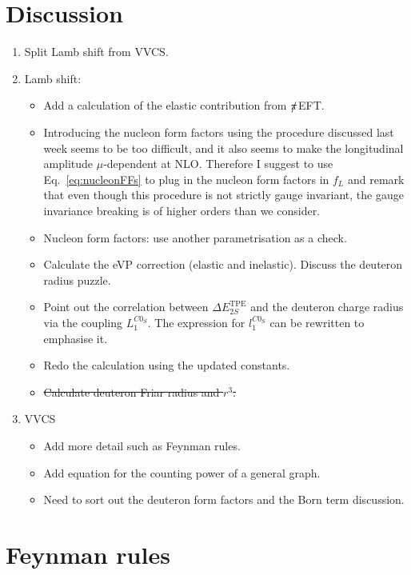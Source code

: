 \documentclass[prl,
twocolumn,
showpacs,preprintnumbers,amsmath,amssymb,
superscriptaddress,
a4paper,nofootinbib,longbibliography]{revtex4-2}
\def\piEFT/{$\slashed{\pi}$EFT}
\begin{document}
\section{Discussion}
\newpage
\begin{enumerate}
    \item Split Lamb shift from VVCS.
    \item Lamb shift:
    \begin{itemize}
        \item Add a calculation of the elastic contribution from \piEFT/.
        \item Introducing the nucleon form factors using the procedure discussed last week seems to be too difficult, and it also seems to make the longitudinal amplitude $\mu$-dependent at NLO. Therefore I suggest to use Eq.~\eqref{eq:nucleonFFs} to plug in the nucleon form factors in $f_L$ and remark that even though this procedure is not strictly gauge invariant, the gauge invariance breaking is of higher orders than we consider.
        \item Nucleon form factors: use another parametrisation as a check.
        \item Calculate the eVP correction (elastic and inelastic). Discuss the deuteron radius puzzle.
        \item Point out the correlation between $\Delta E^\mathrm{TPE}_{2S}$ and the deuteron charge radius via the coupling $L_1^{C0_S}$. The expression for $l_1^{C0_S}$ can be rewritten to emphasise it.
        \item Redo the calculation using the updated constants.
        \item \sout{Calculate deuteron Friar radius and $r^3$.}
    \end{itemize}
    \item VVCS
    \begin{itemize}
        \item Add more detail such as Feynman rules.
        \item Add equation for the counting power of a general graph.
        \item Need to sort out the deuteron form factors and the Born term discussion.
    \end{itemize}
\end{enumerate}


\appendix
\section{Feynman rules}
\end{document}
